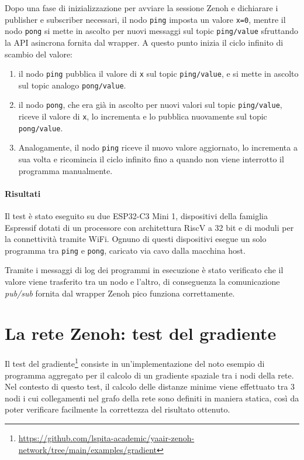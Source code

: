 Dopo una fase di inizializzazione per avviare la sessione Zenoh e dichiarare i
publisher e subscriber necessari, il nodo \texttt{ping} imposta
un valore \texttt{x=0}, mentre il nodo \texttt{pong} si mette in ascolto per nuovi
messaggi sul topic \texttt{ping/value} sfruttando la \ac{API} asincrona fornita dal wrapper.
A questo punto inizia il ciclo infinito di scambio del valore:

\begin{enumerate}
    \item il nodo \texttt{ping} pubblica il valore di \texttt{x} sul topic
    \texttt{ping/value}, e si mette in ascolto sul topic analogo \texttt{pong/value}.
    \item il nodo \texttt{pong}, che era già in ascolto per nuovi valori sul topic
    \texttt{ping/value}, riceve il valore di \texttt{x}, lo incrementa e lo pubblica
    nuovamente sul topic \texttt{pong/value}.
    \item Analogamente, il nodo \texttt{ping} riceve il nuovo valore aggiornato,
    lo incrementa a sua volta e ricomincia il ciclo infinito fino a quando non viene
    interrotto il programma manualmente.
\end{enumerate}

\paragraph{Risultati}
Il test è stato eseguito su due ESP32-C3 Mini 1, dispositivi della famiglia Espressif
dotati di un processore con architettura RiscV a 32 bit e di moduli per la
connettività tramite WiFi.
Ognuno di questi dispositivi esegue un solo programma tra \texttt{ping}
e \texttt{pong}, caricato via cavo dalla macchina host.

Tramite i messaggi di log dei programmi in esecuzione è stato verificato che il
valore viene trasferito tra un nodo e l'altro, di conseguenza la comunicazione
\emph{pub/sub} fornita dal wrapper Zenoh pico funziona correttamente.

\section{La rete Zenoh: test del gradiente}
\label{sec:zenoh-network-gradient-test}

Il test del gradiente\footnote{\url{https://github.com/lspita-academic/yaair-zenoh-network/tree/main/examples/gradient}}
consiste in un'implementazione del noto esempio di programma
aggregato per il calcolo di un gradiente spaziale tra i nodi della rete.
Nel contesto di questo test, il calcolo delle distanze minime viene effettuato
tra 3 nodi i cui collegamenti nel grafo della rete sono definiti in maniera statica,
così da poter verificare facilmente la correttezza del risultato ottenuto.

